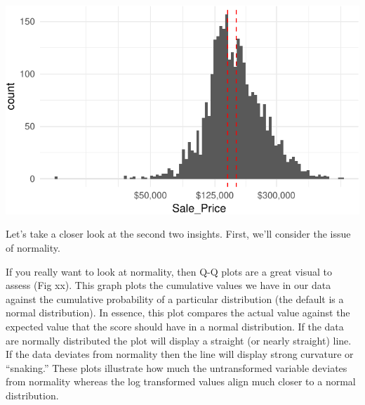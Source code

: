 \documentclass[]{article}
\newenvironment{Shaded}{\begin{snugshade}}{\end{snugshade}}
\newcommand{\KeywordTok}[1]{\textcolor[rgb]{0.13,0.29,0.53}{\textbf{#1}}}
\newcommand{\DataTypeTok}[1]{\textcolor[rgb]{0.13,0.29,0.53}{#1}}
\newcommand{\DecValTok}[1]{\textcolor[rgb]{0.00,0.00,0.81}{#1}}
\newcommand{\CharTok}[1]{\textcolor[rgb]{0.31,0.60,0.02}{#1}}
\newcommand{\StringTok}[1]{\textcolor[rgb]{0.31,0.60,0.02}{#1}}
\newcommand{\CommentTok}[1]{\textcolor[rgb]{0.56,0.35,0.01}{\textit{#1}}}
\newcommand{\OperatorTok}[1]{\textcolor[rgb]{0.81,0.36,0.00}{\textbf{#1}}}
\newcommand{\NormalTok}[1]{#1}
\begin{document}
\begin{center}\includegraphics{Chapter_3_-_Visualization_files/figure-latex/logtrans-1} \end{center}

Let's take a closer look at the second two insights. First, we'll
consider the issue of normality.

If you really want to look at normality, then Q-Q plots are a great
visual to assess (Fig xx). This graph plots the cumulative values we
have in our data against the cumulative probability of a particular
distribution (the default is a normal distribution). In essence, this
plot compares the actual value against the expected value that the score
should have in a normal distribution. If the data are normally
distributed the plot will display a straight (or nearly straight) line.
If the data deviates from normality then the line will display strong
curvature or ``snaking.'' These plots illustrate how much the
untransformed variable deviates from normality whereas the log
transformed values align much closer to a normal distribution.

\begin{Shaded}
\end{Shaded}
\end{document}
